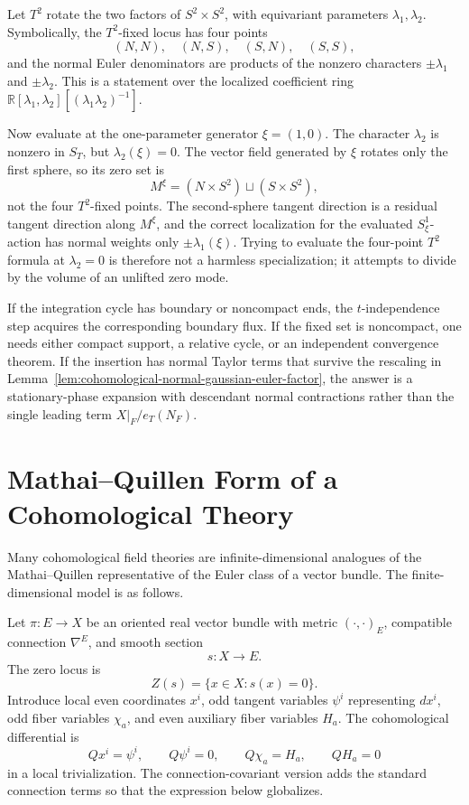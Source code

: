 \begin{example}
\label{ex:cohomological-rank-two-weight-hyperplane}
Let \(T^2\) rotate the two factors of \(S^2\times S^2\), with equivariant
parameters \(\lambda_1,\lambda_2\).  Symbolically, the \(T^2\)-fixed locus has
four points
\[
  (N,N),\quad (N,S),\quad (S,N),\quad (S,S),
\]
and the normal Euler denominators are products of the nonzero characters
\(\pm\lambda_1\) and \(\pm\lambda_2\).
This is a statement over the localized coefficient ring
\(\mathbb R[\lambda_1,\lambda_2][(\lambda_1\lambda_2)^{-1}]\).

Now evaluate at the one-parameter generator \(\xi=(1,0)\).  The character
\(\lambda_2\) is nonzero in \(S_T\), but \(\lambda_2(\xi)=0\).  The vector
field generated by \(\xi\) rotates only the first sphere, so its zero set is
\[
  M^\xi=(N\times S^2)\sqcup(S\times S^2),
\]
not the four \(T^2\)-fixed points.  The second-sphere tangent direction is a
residual tangent direction along \(M^\xi\), and the correct localization for
the evaluated \(S^1_\xi\)-action has normal weights only
\(\pm\lambda_1(\xi)\).  Trying to evaluate the four-point \(T^2\) formula at
\(\lambda_2=0\) is therefore not a harmless specialization; it attempts to
divide by the volume of an unlifted zero mode.
\end{example}

If the integration cycle has boundary or noncompact ends, the
\(t\)-independence step acquires the corresponding boundary flux.  If the
fixed set is noncompact, one needs either compact support, a relative cycle,
or an independent convergence theorem.  If the insertion has normal Taylor
terms that survive the rescaling in
Lemma~\ref{lem:cohomological-normal-gaussian-euler-factor}, the answer is a
stationary-phase expansion with descendant normal contractions rather than the
single leading term \(X|_F/e_T(N_F)\).

\section{Mathai--Quillen Form of a Cohomological Theory}

Many cohomological field theories are infinite-dimensional analogues of the
Mathai--Quillen representative of the Euler class of a vector bundle.  The
finite-dimensional model is as follows.

Let \(\pi:E\to X\) be an oriented real vector bundle with metric
\((\cdot,\cdot)_E\), compatible connection \(\nabla^E\), and smooth section
\[
  s:X\to E.
\]
The zero locus is
\[
  Z(s)=\{x\in X:s(x)=0\}.
\]
Introduce local even coordinates \(x^i\), odd tangent variables \(\psi^i\)
representing \(dx^i\), odd fiber variables \(\chi_a\), and even auxiliary
fiber variables \(H_a\).  The cohomological differential is
\begin{equation}
  Qx^i=\psi^i,\qquad Q\psi^i=0,\qquad
  Q\chi_a=H_a,\qquad QH_a=0
  \label{eq:mq-q-rules-flat}
\end{equation}
in a local trivialization.  The connection-covariant version adds the
standard connection terms so that the expression below globalizes.

